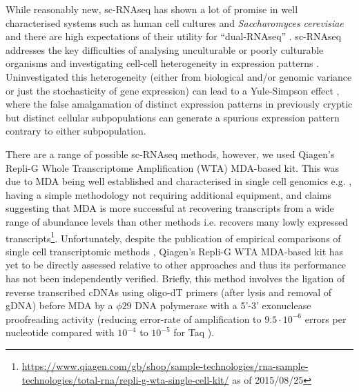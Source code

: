 While reasonably new, sc-RNAseq has shown a lot of promise in well characterised systems such as human cell cultures \citep{Bengtsson2005,Shalek2013}
and \textit{Saccharomyces cerevisiae} \citep{Lipson2009} and there are high expectations
of their utility for ``dual-RNAseq'' \citep{Westermann2012}.  sc-RNAseq addresses 
the key difficulties of analysing unculturable or poorly culturable organisms \citep{Murray2012} and investigating
cell-cell heterogeneity in expression patterns \citep{Raj2008,Shalek2013}.  
Uninvestigated this heterogeneity (either from biological and/or genomic variance or just the stochasticity of gene expression)
can lead to a Yule-Simpson effect \citep{Yule1903a,Simpson1951}, where the false amalgamation of distinct expression patterns
in previously cryptic but distinct cellular subpopulations can generate a spurious expression pattern contrary to either subpopulation.


There are a range of possible sc-RNAseq methods, however, we used Qiagen's Repli-G Whole Transcriptome Amplification (WTA) MDA-based kit.  This was due to MDA 
being well established and characterised in single cell genomics e.g. \citep{Spits2006}, 
having a simple methodology not requiring additional equipment, and claims 
suggesting that MDA is more successful at
recovering transcripts from a wide range of abundance levels than other methods i.e. recovers many lowly expressed transcripts\footnote{\url{https://www.qiagen.com/gb/shop/sample-technologies/rna-sample-technologies/total-rna/repli-g-wta-single-cell-kit/} as of 2015/08/25}.
Unfortunately, despite the publication of empirical comparisons of single cell transcriptomic methods \citep{Wu2014a}, 
Qiagen's Repli-G WTA MDA-based kit has yet to be directly assessed relative to other approaches and thus its performance has not
been independently verified. 
Briefly, this method involves the ligation of reverse transcribed cDNAs using oligo-dT primers (after lysis and 
removal of gDNA) before MDA by a \(\phi29\) DNA polymerase with a 5'-3' exonuclease proofreading activity \citep{Korfhage2015}
(reducing error-rate of amplification to \(9.5\cdot10^{-6}\) errors per nucleotide \citep{Paez2004} compared with
\(10^{-4}\) to \(10^{-5}\) for Taq \citep{Tindall1988,Eckert1990}).



